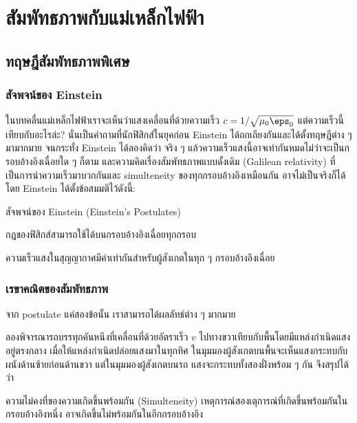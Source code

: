 \chapter{สัมพัทธภาพกับแม่เหล็กไฟฟ้า}

\section{ทฤษฎีสัมพัทธภาพพิเศษ}

\subsection{สัจพจน์ของ Einstein}

ในบทคลื่นแม่เหล็กไฟฟ้าเราจะเห็นว่าแสงเคลื่อนที่ด้วยความเร็ว $c = 1/\sqrt{\mu_0\eps_0}$ แต่ความเร็วนี้เทียบกับอะไรล่ะ? นั่นเป็นคำถามที่นักฟิสิกส์ในยุคก่อน Einstein ได้ถกเถียงกันและได้ตั้งทฤษฎีต่าง ๆ มามากมาย จนกระทั่ง Einstein ได้ลองคิดว่า จริง ๆ แล้วความเร็วแสงนี้อาจเท่ากันหมดไม่ว่าจะเป็นกรอบอ้างอิงเฉื่อยใด ๆ ก็ตาม และความคิดเรื่องสัมพัทธภาพแบบดั้งเดิม (Galilean relativity) ที่เป็นการนำความเร็วมาบวกกันและ simulteneity ของทุกกรอบอ้างอิงเหมือนกัน อาจไม่เป็นจริงก็ได้ โดย Einstein ได้ตั้งข้อสมมติไว้ดังนี้:
\begin{lawbox}{สัจพจน์ของ Einstein (Einstein's Postulates)}
    \begin{compactenum}
        \item กฎของฟิสิกส์สามารถใช้ได้บนกรอบอ้างอิงเฉื่อยทุกกรอบ
        \item ความเร็วแสงในสุญญากาศมีค่าเท่ากันสำหรับผู้สังเกตในทุก ๆ กรอบอ้างอิงเฉื่อย
    \end{compactenum}
\end{lawbox}

\subsection{เรขาคณิตของสัมพัทธภาพ}

จาก postulate แค่สองข้อนั้น เราสามารถได้ผลลัทธ์ต่าง ๆ มากมาย

ลองพิจารณารถบรรทุกคันหนึงที่เคลื่อนที่ด้วยอัตราเร็ว $v$ ไปทางขวาเทียบกับพื้นโดยมีแหล่งกำเนิดแสงอยู่ตรงกลาง เมื่อให้แหล่งกำเนิดปล่อยแสงมาในทุกทิศ ในมุมมองผู้สังเกตบนพื้นจะเห็นแสงกระทบกับผนังด้านซ้ายก่อนด้านขวา แต่ในมุมมองผู้สังเกตบนรถ แสงจะกระทบทั้งสองฝั่งพร้อม ๆ กัน จึงสรุปได้ว่า
\begin{lawbox}{ความไม่คงที่ของความเกิดขึ้นพร้อมกัน (Simulteneity)}
    เหตุการณ์สองเตุการณ์ที่เกิดขึ้นพร้อมกันในกรอบอ้างอิงหนึ่ง อาจเกิดขึ้นไม่พร้อมกันในอีกกรอบอ้างอิง
\end{lawbox}

